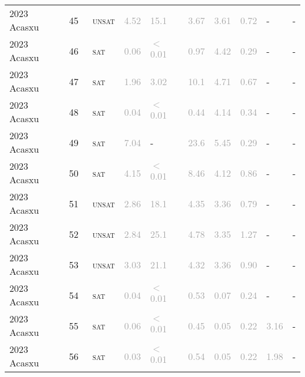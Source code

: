 \begin{center}
{\begin{longtable}{@{}llllllllll@{}}
2023 Acasxu & 45 & ~\textsc{unsat} & \textcolor{darkgray}{4.52} & \textcolor{darkgray}{15.1} & \textcolor{darkgray}{3.67} & \textcolor{darkgray}{3.61} & \textcolor{darkgray}{0.72} & - & - \\
2023 Acasxu & 46 & ~\textsc{sat} & \textcolor{darkgray}{0.06} & \textcolor{darkgray}{$<$0.01} & \textcolor{darkgray}{0.97} & \textcolor{darkgray}{4.42} & \textcolor{darkgray}{0.29} & - & - \\
2023 Acasxu & 47 & ~\textsc{sat} & \textcolor{darkgray}{1.96} & \textcolor{darkgray}{3.02} & \textcolor{darkgray}{10.1} & \textcolor{darkgray}{4.71} & \textcolor{darkgray}{0.67} & - & - \\
2023 Acasxu & 48 & ~\textsc{sat} & \textcolor{darkgray}{0.04} & \textcolor{darkgray}{$<$0.01} & \textcolor{darkgray}{0.44} & \textcolor{darkgray}{4.14} & \textcolor{darkgray}{0.34} & - & - \\
2023 Acasxu & 49 & ~\textsc{sat} & \textcolor{darkgray}{7.04} & - & \textcolor{darkgray}{23.6} & \textcolor{darkgray}{5.45} & \textcolor{darkgray}{0.29} & - & - \\
2023 Acasxu & 50 & ~\textsc{sat} & \textcolor{darkgray}{4.15} & \textcolor{darkgray}{$<$0.01} & \textcolor{darkgray}{8.46} & \textcolor{darkgray}{4.12} & \textcolor{darkgray}{0.86} & - & - \\
2023 Acasxu & 51 & ~\textsc{unsat} & \textcolor{darkgray}{2.86} & \textcolor{darkgray}{18.1} & \textcolor{darkgray}{4.35} & \textcolor{darkgray}{3.36} & \textcolor{darkgray}{0.79} & - & - \\
2023 Acasxu & 52 & ~\textsc{unsat} & \textcolor{darkgray}{2.84} & \textcolor{darkgray}{25.1} & \textcolor{darkgray}{4.78} & \textcolor{darkgray}{3.35} & \textcolor{darkgray}{1.27} & - & - \\
2023 Acasxu & 53 & ~\textsc{unsat} & \textcolor{darkgray}{3.03} & \textcolor{darkgray}{21.1} & \textcolor{darkgray}{4.32} & \textcolor{darkgray}{3.36} & \textcolor{darkgray}{0.90} & - & - \\
2023 Acasxu & 54 & ~\textsc{sat} & \textcolor{darkgray}{0.04} & \textcolor{darkgray}{$<$0.01} & \textcolor{darkgray}{0.53} & \textcolor{darkgray}{0.07} & \textcolor{darkgray}{0.24} & - & - \\
2023 Acasxu & 55 & ~\textsc{sat} & \textcolor{darkgray}{0.06} & \textcolor{darkgray}{$<$0.01} & \textcolor{darkgray}{0.45} & \textcolor{darkgray}{0.05} & \textcolor{darkgray}{0.22} & \textcolor{darkgray}{3.16} & - \\
2023 Acasxu & 56 & ~\textsc{sat} & \textcolor{darkgray}{0.03} & \textcolor{darkgray}{$<$0.01} & \textcolor{darkgray}{0.54} & \textcolor{darkgray}{0.05} & \textcolor{darkgray}{0.22} & \textcolor{darkgray}{1.98} & - \\

\end{longtable}}
\end{center}
